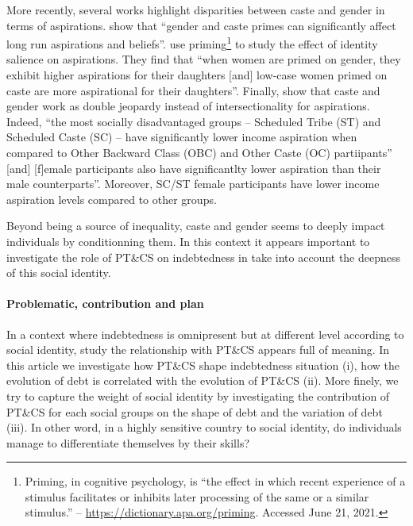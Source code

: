 \documentclass[a4paper, 11pt, onecolumn]{article}
\begin{document}
More recently, several works highlight disparities between caste and gender in terms of aspirations.
\cite{Mukherjee2017} show that ``gender and caste primes can significantly affect long run aspirations and beliefs''. 
\cite{Alvi2019} use priming\footnote{Priming, in cognitive psychology, is ``the effect in which recent experience of a stimulus facilitates or inhibits later processing of the same or a similar stimulus.'' -- \url{https://dictionary.apa.org/priming}. Accessed June 21, 2021.} to study the effect of identity salience on aspirations.
They find that ``when women are primed on gender, they exhibit higher aspirations for their daughters [and] low-case  women primed on caste are more aspirational for their daughters''.
Finally, \cite{Sarkar2020} show that caste and gender work as double jeopardy instead of intersectionality for aspirations.
Indeed, ``the most socially disadvantaged groups -- Scheduled Tribe (ST) and Scheduled Caste (SC) -- have significantly lower income aspiration when compared to Other Backward Class (OBC) and Other Caste (OC) partiipants'' [and] [f]emale participants also have significantlty lower aspiration than their male counterparts''.
Moreover, SC/ST female participants have lower income aspiration levels compared to other groups.

Beyond being a source of inequality, caste and gender seems to deeply impact individuals by conditionning them.
In this context it appears important to investigate the role of PT\&CS on indebtedness in take into account the deepness of this social identity.


\paragraph{Problematic, contribution and plan}
In a context where indebtedness is omnipresent but at different level according to social identity, study the relationship with PT\&CS appears full of meaning.
In this article we investigate how PT\&CS shape indebtedness situation (i), how the evolution of debt is correlated with the evolution of PT\&CS (ii).
More finely, we try to capture the weight of social identity by investigating the contribution of PT\&CS for each social groups on the shape of debt and the variation of debt (iii).
In other word, in a highly sensitive country to social identity, do individuals manage to differentiate themselves by their skills?
\end{document}
